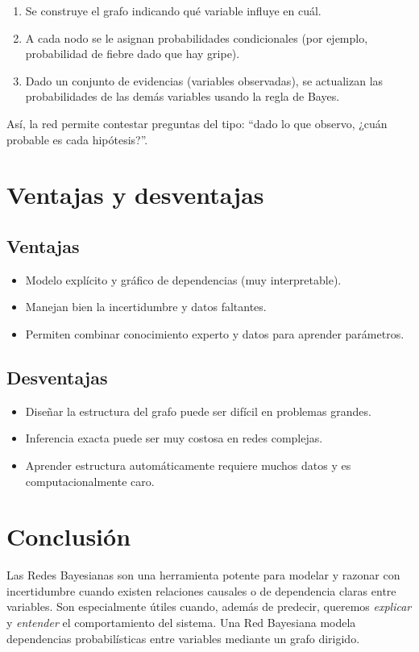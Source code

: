 \documentclass[8pt,a4paper]{article}
\begin{document}
\begin{enumerate}
    \item Se construye el grafo indicando qué variable influye en cuál.
    \item A cada nodo se le asignan probabilidades condicionales (por ejemplo,
    probabilidad de fiebre dado que hay gripe).
    \item Dado un conjunto de evidencias (variables observadas), se actualizan
    las probabilidades de las demás variables usando la regla de Bayes.
\end{enumerate}

Así, la red permite contestar preguntas del tipo: ``dado lo que observo,
¿cuán probable es cada hipótesis?''.

\section{Ventajas y desventajas}

\subsection*{Ventajas}
\begin{itemize}
    \item Modelo explícito y gráfico de dependencias (muy interpretable).
    \item Manejan bien la incertidumbre y datos faltantes.
    \item Permiten combinar conocimiento experto y datos para aprender parámetros.
\end{itemize}

\subsection*{Desventajas}
\begin{itemize}
    \item Diseñar la estructura del grafo puede ser difícil en problemas grandes.
    \item Inferencia exacta puede ser muy costosa en redes complejas.
    \item Aprender estructura automáticamente requiere muchos datos y es computacionalmente caro.
\end{itemize}

\section{Conclusión}

Las Redes Bayesianas son una herramienta potente para modelar y razonar con
incertidumbre cuando existen relaciones causales o de dependencia claras
entre variables. Son especialmente útiles cuando, además de predecir,
queremos \emph{explicar} y \emph{entender} el comportamiento del sistema. Una Red Bayesiana modela dependencias probabilísticas entre variables mediante un grafo dirigido.
\end{document}
